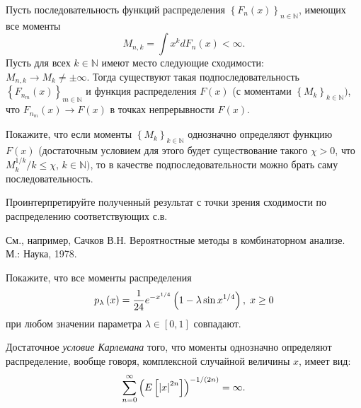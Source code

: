 \begin{problem} 
Пусть последовательность функций 
распределения $\left\{ {F_n \left( x \right)} \right\}_{n\in {\mathbb N}} $, 
имеющих все моменты 
\[M_{n,k} =\int {x^kdF_n \left( x \right)} <\infty. \] 
Пусть для всех $k\in {\mathbb N}$ имеют место следующие сходимости:\\ $M_{n,k} \to 
M_k \ne \pm \infty $. Тогда существуют такая подпоследовательность $\left\{ 
{F_{n_m } \left( x \right)} \right\}_{m\in {\mathbb N}} $ и функция 
распределения $F\left( x \right)$ (с моментами $\left\{ {M_k } 
\right\}_{k\in {\mathbb N}} )$, что $F_{n_m } \left( x \right)\to F\left( x 
\right)$ в точках непрерывности $F\left( x \right)$.

Покажите, что если моменты $\left\{ {M_k } \right\}_{k\in {\mathbb N}} $ 
однозначно определяют функцию $F\left( x \right)$ (достаточным условием для 
этого будет существование такого $\chi >0$, что 
$ M_k^{1/k} / k \leq \chi $, $k\in {\mathbb N})$, то в качестве подпоследовательности можно брать 
саму последовательность.

Проинтерпретируйте полученный результат с точки зрения сходимости по 
распределению соответствующих с.в.
\end{problem}
\begin{remark}
См., например, Сачков В.Н. Вероятностные методы в комбинаторном анализе. М.: Наука, 1978.
\end{remark}

\begin{problem}

Покажите, что все моменты распределения
$$p_{\lambda } \left(x\right)=\frac{1}{24} e^{-x^{{1\mathord{\left/ {\vphantom {1 4}} \right. \kern-\nulldelimiterspace} 4} } } \left(1-\lambda \sin x^{{1\mathord{\left/ {\vphantom {1 4}} \right. \kern-\nulldelimiterspace} 4} } \right),\; x\ge 0$$
при любом значении параметра $\lambda \in \left[0,1\right]$ совпадают.

\begin{remark}

Достаточное \textit{условие Карлемана} того, что моменты однозначно определяют распределение, вообще говоря, комплексной случайной величины $x$, имеет вид:
$$
\sum _{n=0}^{\infty }\left(E\left[\left|x\right|^{2n} \right]\right)^{{-1\mathord{\left/ {\vphantom {-1 \left(2n\right)}} \right. \kern-\nulldelimiterspace} \left(2n\right)} } =\infty.
$$

\end{remark}

\end{problem} 

